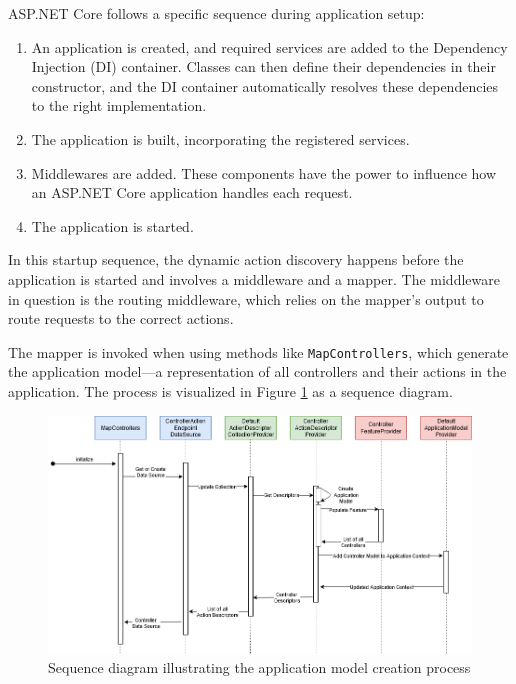 ASP.NET Core follows a specific sequence during application setup:

\begin{enumerate}
    \item An application is created, and required services are added to the Dependency Injection (DI) container. Classes can then define their dependencies in their constructor, and the DI container automatically resolves these dependencies to the right implementation.
    \item The application is built, incorporating the registered services.
    \item Middlewares are added. These components have the power to influence how an ASP.NET Core application handles each request.
    \item The application is started.
\end{enumerate}

In this startup sequence, the dynamic action discovery happens before the application is started and involves a middleware and a mapper. The middleware in question is the routing middleware, which relies on the mapper's output to route requests to the correct actions.

The mapper is invoked when using methods like \verb|MapControllers|, which generate the application model—a representation of all controllers and their actions in the application. The process is visualized in Figure \ref{fig:sequence-diagram} as a sequence diagram.

\begin{figure}[H]
\centering
\includegraphics[width=1\textwidth]{graphics/Sequence Diagram.drawio.png}
\caption{Sequence diagram illustrating the application model creation process}
\label{fig:sequence-diagram}
\end{figure}

